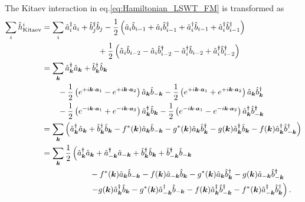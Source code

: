\documentclass[11pt, aps, longbibliography]{article}
\begin{document}
The Kitaev interaction in eq.\eqref{eq:Hamiltonian_LSWT_FM} is transformed as
\begin{align}
    \sum_{i}\hat{h}_{\rm Kitaev}^i &= \sum_{i} \hat{a}^\dagger_i \hat{a}_i + \hat{b}^\dagger_j \hat{b}_j -\frac{1}{2}\left( \hat{a}_i\hat{b}_{i-1} + \hat{a}_i\hat{b}_{i-1}^\dagger + \hat{a}_i^\dagger \hat{b}_{i-1} + \hat{a}_i^\dagger\hat{b}_{i-1}^\dagger \right) \notag \\ 
        & \quad \quad \quad \quad \quad \quad \quad  + \frac{1}{2} \left( \hat{a}_i\hat{b}_{i-2} - \hat{a}_i\hat{b}_{i-2}^\dagger - \hat{a}_i^\dagger \hat{b}_{i-2} + \hat{a}_i^\dagger\hat{b}_{i-2}^\dagger \right) \notag  \\
        &= \sum_{\bm{k}} \hat{a}_{\bm{k}}^\dagger\hat{a}_{\bm{k}} + \hat{b}_{\bm{k}}^\dagger\hat{b}_{\bm{k}} \notag \\ 
        & \quad \quad -\frac{1}{2}\left( e^{+i\bm{k}\cdot\bm{a}_1} - e^{+i\bm{k}\cdot\bm{a}_2} \right) \hat{a}_{\bm{k}}\hat{b}_{-\bm{k}} -\frac{1}{2}\left( e^{+i\bm{k}\cdot\bm{a}_1} + e^{+i\bm{k}\cdot\bm{a}_2} \right) \hat{a}_{\bm{k}}\hat{b}_{\bm{k}}^\dagger \notag \\ 
        & \quad \quad -\frac{1}{2}\left( e^{-i\bm{k}\cdot\bm{a}_1} + e^{-i\bm{k}\cdot\bm{a}_2} \right) \hat{a}_{\bm{k}}^\dagger \hat{b}_{\bm{k}} -\frac{1}{2}\left( e^{-i\bm{k}\cdot\bm{a}_1} - e^{-i\bm{k}\cdot\bm{a}_2} \right) \hat{a}_{\bm{k}}^\dagger \hat{b}_{-\bm{k}}^\dagger \notag \\ 
        &= \sum_{\bm{k}}\left( \hat{a}_{\bm{k}}^\dagger\hat{a}_{\bm{k}} + \hat{b}_{\bm{k}}^\dagger\hat{b}_{\bm{k}} - f^*(\bm{k})\hat{a}_{\bm{k}}\hat{b}_{-\bm{k}} - g^*(\bm{k})\hat{a}_{\bm{k}}\hat{b}_{\bm{k}}^\dagger - g(\bm{k})\hat{a}_{\bm{k}}^\dagger \hat{b}_{\bm{k}} - f(\bm{k})\hat{a}_{\bm{k}}^\dagger\hat{b}_{-\bm{k}}^\dagger \right) \notag \\
        &= \sum_{\bm{k}} \frac{1}{2}\left( \hat{a}_{\bm{k}}^\dagger\hat{a}_{\bm{k}} + \hat{a}_{-\bm{k}}^\dagger\hat{a}_{-\bm{k}} + \hat{b}_{\bm{k}}^\dagger\hat{b}_{\bm{k}} + \hat{b}_{-\bm{k}}^\dagger\hat{b}_{-\bm{k}}  \right. \notag \\
        & \quad \quad \quad \quad \quad \quad  - f^*(\bm{k})\hat{a}_{\bm{k}}\hat{b}_{-\bm{k}} - f(\bm{k})\hat{a}_{-\bm{k}}\hat{b}_{\bm{k}} - g^*(\bm{k})\hat{a}_{\bm{k}}\hat{b}_{\bm{k}}^\dagger - g(\bm{k})\hat{a}_{-\bm{k}}\hat{b}_{-\bm{k}}^\dagger \notag \\
        & \quad \quad \quad \quad \quad \quad \left.- g(\bm{k})\hat{a}_{\bm{k}}^\dagger \hat{b}_{\bm{k}} - g^*(\bm{k}) \hat{a}_{-\bm{k}}^\dagger \hat{b}_{-\bm{k}} - f(\bm{k})\hat{a}_{\bm{k}}^\dagger\hat{b}_{-\bm{k}}^\dagger - f^*(\bm{k})\hat{a}_{-\bm{k}}^\dagger\hat{b}_{\bm{k}}^\dagger \right).
\end{align}
\end{document}
